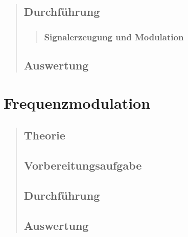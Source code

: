 \begin{quote}
    \subsection{Durchführung}
    \begin{quote}
    	\subsubsection{Signalerzeugung und Modulation}
    	\begin{quote}
    	\end{quote}
    	    
    
    \end{quote}
    
    \subsection{Auswertung}
    \begin{quote}    
    \end{quote}
\end{quote}



\section{Frequenzmodulation}
\begin{quote}
    \subsection{Theorie}
    \begin{quote}
    \end{quote}
    
    \subsection{Vorbereitungsaufgabe}
    \begin{quote}
    \end{quote}
    
    \subsection{Durchführung}
    \begin{quote}
    \end{quote}
    
    \subsection{Auswertung}
    \begin{quote}
    \end{quote}
    
\end{quote}

